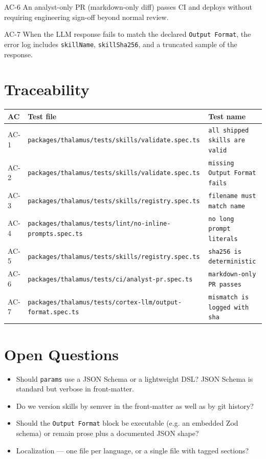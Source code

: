 \begin{ac}{AC-6}
An analyst-only PR (markdown-only diff) passes CI and deploys without requiring engineering
sign-off beyond normal review.
\end{ac}

\begin{ac}{AC-7}
When the LLM response fails to match the declared \texttt{Output Format}, the error log
includes \texttt{skillName}, \texttt{skillSha256}, and a truncated sample of the response.
\end{ac}

\section{Traceability}

\begin{center}
\begin{tabular}{@{}lll@{}}
\toprule
AC & Test file & Test name \\
\midrule
AC-1 & \texttt{packages/thalamus/tests/skills/validate.spec.ts} & \texttt{all shipped skills are valid} \\
AC-2 & \texttt{packages/thalamus/tests/skills/validate.spec.ts} & \texttt{missing Output Format fails} \\
AC-3 & \texttt{packages/thalamus/tests/skills/registry.spec.ts} & \texttt{filename must match name} \\
AC-4 & \texttt{packages/thalamus/tests/lint/no-inline-prompts.spec.ts} & \texttt{no long prompt literals} \\
AC-5 & \texttt{packages/thalamus/tests/skills/registry.spec.ts} & \texttt{sha256 is deterministic} \\
AC-6 & \texttt{packages/thalamus/tests/ci/analyst-pr.spec.ts} & \texttt{markdown-only PR passes} \\
AC-7 & \texttt{packages/thalamus/tests/cortex-llm/output-format.spec.ts} & \texttt{mismatch is logged with sha} \\
\bottomrule
\end{tabular}
\end{center}

\section{Open Questions}
\begin{itemize}[leftmargin=1.2em]
  \item Should \texttt{params} use a JSON Schema or a lightweight DSL? JSON Schema is
        standard but verbose in front-matter.
  \item Do we version skills by semver in the front-matter as well as by git history?
  \item Should the \texttt{Output Format} block be executable (e.g. an embedded Zod schema)
        or remain prose plus a documented JSON shape?
  \item Localization --- one file per language, or a single file with tagged sections?
\end{itemize}


